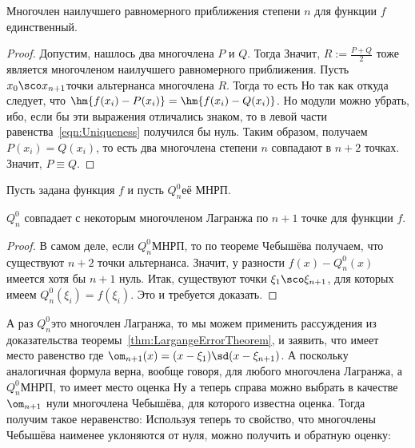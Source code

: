 \documentclass[a4paper]{article}
\begin{document}
\begin{theorem}
Многочлен наилучшего равномерного приближения степени $n$ для функции $f$ единственный.
\end{theorem}
\begin{proof}
Допустим, нашлось два многочлена $P$ и $Q$. Тогда
Значит, $R := \frac{P+Q}{2}$ тоже является многочленом наилучшего равномерного приближения.
Пусть $x_0\sco x_{n+1}$\т точки альтернанса многочлена $R$. Тогда
 то есть
 Но так как
откуда следует, что $\hm{f(x_i) - P(x_i)} = \hm{f(x_i) - Q(x_i)}$. Но модули можно убрать, ибо, если
бы эти выражения отличались знаком, то в левой части равенства~\eqref{eqn:Uniqueness} получился бы нуль.
Таким образом, получаем $P(x_i) = Q(x_i)$, то есть два многочлена степени $n$ совпадают в $n+2$ точках.
Значит, $P\equiv Q$.
\end{proof}

Пусть задана функция $f$ и пусть $Q_n^0$\т её МНРП.

\begin{stm}
$Q_n^0$ совпадает с некоторым многочленом Лагранжа по $n+1$ точке для функции $f$.
\end{stm}
\begin{proof}
В самом деле, если $Q_n^0$\т МНРП, то по теореме Чебышёва получаем, что существуют $n+2$
точки альтернанса. Значит, у разности $f(x) - Q_n^0(x)$ имеется хотя бы $n+1$ нуль.
Итак, существуют точки $\xi_1\sco\xi_{n+1}$, для которых имеем $Q_n^0(\xi_i) = f(\xi_i)$.
Это и требуется доказать.
\end{proof}

А раз $Q_n^0$\т это многочлен Лагранжа, то мы можем применить рассуждения
из доказательства теоремы~\ref{thm:LargangeErrorTheorem}, и заявить, что имеет место равенство
где $\om_{n+1}(x) = (x-\xi_1)\sd(x-\xi_{n+1})$.
А поскольку аналогичная формула верна, вообще говоря, для любого многочлена Лагранжа,
а $Q_n^0$\т МНРП, то имеет место оценка
Ну а теперь справа можно выбрать в качестве $\om_{n+1}$ нули многочлена Чебышёва, для которого известна
оценка. Тогда получим такое неравенство:
Используя теперь то свойство, что многочлены Чебышёва наименее уклоняются от нуля,
можно получить и обратную оценку:
\end{document}
